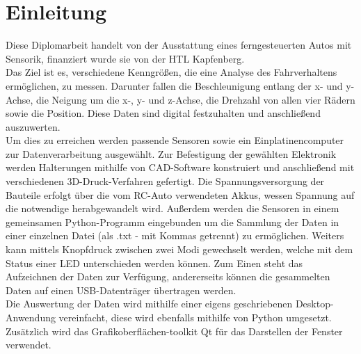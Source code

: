 \section{Einleitung}
\label{sec:einleitung}
Diese Diplomarbeit handelt von der Ausstattung eines ferngesteuerten Autos mit Sensorik, finanziert wurde sie von der HTL Kapfenberg.\\
Das Ziel ist es, verschiedene Kenngrößen, die eine Analyse des Fahrverhaltens ermöglichen, zu messen. Darunter fallen die Beschleunigung entlang der x- und y-Achse, die Neigung um die x-, y- und z-Achse, die Drehzahl von allen vier Rädern sowie die Position. Diese Daten sind digital festzuhalten und anschließend auszuwerten. \\
Um dies zu erreichen werden passende Sensoren sowie ein Einplatinencomputer zur Datenverarbeitung ausgewählt. Zur Befestigung der gewählten Elektronik werden Halterungen mithilfe von CAD-Software konstruiert und anschließend mit verschiedenen 3D-Druck-Verfahren gefertigt. Die Spannungsversorgung der Bauteile erfolgt über die vom RC-Auto verwendeten Akkus, wessen Spannung auf die notwendige herabgewandelt wird. Außerdem werden die Sensoren in einem gemeinsamen Python-Programm eingebunden um die Sammlung der Daten in einer einzelnen Datei (als .txt - mit Kommas getrennt) zu ermöglichen. Weiters kann mittels Knopfdruck zwischen zwei Modi gewechselt werden, welche mit dem Status einer LED unterschieden werden können. Zum Einen steht das Aufzeichnen der Daten zur Verfügung, andererseits können die gesammelten Daten auf einen USB-Datenträger übertragen werden. \\
Die Auswertung der Daten wird mithilfe einer eigens geschriebenen Desktop-Anwendung vereinfacht, diese wird ebenfalls mithilfe von Python umgesetzt. Zusätzlich wird das Grafikoberflächen-toolkit Qt für das Darstellen der Fenster verwendet.